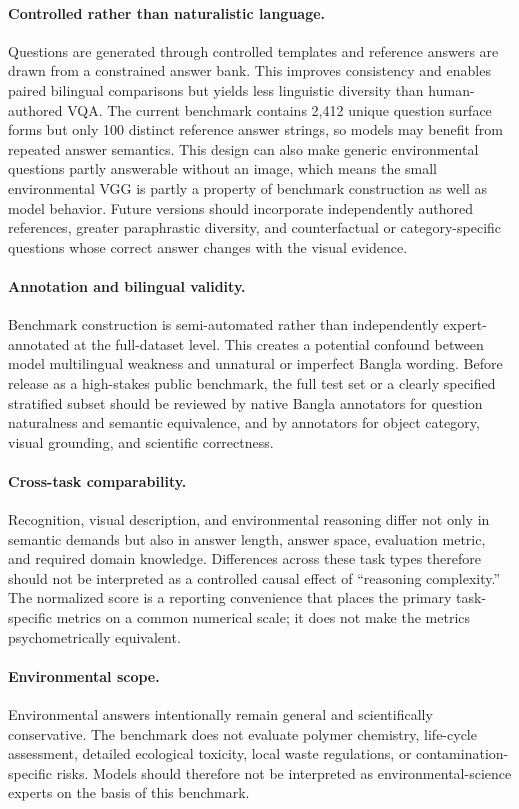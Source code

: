 \documentclass{article}
\begin{document}
\paragraph{Controlled rather than naturalistic language.}
Questions are generated through controlled templates and reference answers are drawn from a constrained answer bank. This improves consistency and enables paired bilingual comparisons but yields less linguistic diversity than human-authored VQA. The current benchmark contains 2,412 unique question surface forms but only 100 distinct reference answer strings, so models may benefit from repeated answer semantics. This design can also make generic environmental questions partly answerable without an image, which means the small environmental VGG is partly a property of benchmark construction as well as model behavior. Future versions should incorporate independently authored references, greater paraphrastic diversity, and counterfactual or category-specific questions whose correct answer changes with the visual evidence.

\paragraph{Annotation and bilingual validity.}
Benchmark construction is semi-automated rather than independently expert-annotated at the full-dataset level. This creates a potential confound between model multilingual weakness and unnatural or imperfect Bangla wording. Before release as a high-stakes public benchmark, the full test set or a clearly specified stratified subset should be reviewed by native Bangla annotators for question naturalness and semantic equivalence, and by annotators for object category, visual grounding, and scientific correctness.

\paragraph{Cross-task comparability.}
Recognition, visual description, and environmental reasoning differ not only in semantic demands but also in answer length, answer space, evaluation metric, and required domain knowledge. Differences across these task types therefore should not be interpreted as a controlled causal effect of ``reasoning complexity.'' The normalized score is a reporting convenience that places the primary task-specific metrics on a common numerical scale; it does not make the metrics psychometrically equivalent.

\paragraph{Environmental scope.}
Environmental answers intentionally remain general and scientifically conservative. The benchmark does not evaluate polymer chemistry, life-cycle assessment, detailed ecological toxicity, local waste regulations, or contamination-specific risks. Models should therefore not be interpreted as environmental-science experts on the basis of this benchmark.
\end{document}
